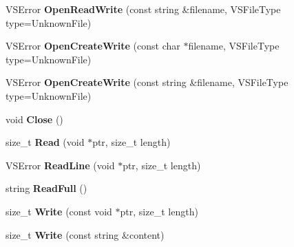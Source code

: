 \begin{DoxyCompactItemize}
\item 
V\+S\+Error {\bfseries Open\+Read\+Write} (const string \&filename, V\+S\+File\+Type type=Unknown\+File)\hypertarget{classVSFileSystem_1_1VSFile_a8e0862f673f012bb6ba94f48afb51826}{}\label{classVSFileSystem_1_1VSFile_a8e0862f673f012bb6ba94f48afb51826}

\item 
V\+S\+Error {\bfseries Open\+Create\+Write} (const char $\ast$filename, V\+S\+File\+Type type=Unknown\+File)\hypertarget{classVSFileSystem_1_1VSFile_a9a5d115a0b1c97c93ce5ae2b8adcd36b}{}\label{classVSFileSystem_1_1VSFile_a9a5d115a0b1c97c93ce5ae2b8adcd36b}

\item 
V\+S\+Error {\bfseries Open\+Create\+Write} (const string \&filename, V\+S\+File\+Type type=Unknown\+File)\hypertarget{classVSFileSystem_1_1VSFile_ae4252231c13ac3e5810cb571decf3c96}{}\label{classVSFileSystem_1_1VSFile_ae4252231c13ac3e5810cb571decf3c96}

\item 
void {\bfseries Close} ()\hypertarget{classVSFileSystem_1_1VSFile_aa96e4536ad887ff4af35704e631c41bb}{}\label{classVSFileSystem_1_1VSFile_aa96e4536ad887ff4af35704e631c41bb}

\item 
size\+\_\+t {\bfseries Read} (void $\ast$ptr, size\+\_\+t length)\hypertarget{classVSFileSystem_1_1VSFile_aff562ac3f72d0c66a71f0c0c2bc1d1e7}{}\label{classVSFileSystem_1_1VSFile_aff562ac3f72d0c66a71f0c0c2bc1d1e7}

\item 
V\+S\+Error {\bfseries Read\+Line} (void $\ast$ptr, size\+\_\+t length)\hypertarget{classVSFileSystem_1_1VSFile_a8f5c3bbb8dc24667a7d228d33105b67b}{}\label{classVSFileSystem_1_1VSFile_a8f5c3bbb8dc24667a7d228d33105b67b}

\item 
string {\bfseries Read\+Full} ()\hypertarget{classVSFileSystem_1_1VSFile_a7e4e1f490b2c1dc0c1e14b5dbd3d180b}{}\label{classVSFileSystem_1_1VSFile_a7e4e1f490b2c1dc0c1e14b5dbd3d180b}

\item 
size\+\_\+t {\bfseries Write} (const void $\ast$ptr, size\+\_\+t length)\hypertarget{classVSFileSystem_1_1VSFile_ac1b4429bcab8ca5db9b2239d309fee5e}{}\label{classVSFileSystem_1_1VSFile_ac1b4429bcab8ca5db9b2239d309fee5e}

\item 
size\+\_\+t {\bfseries Write} (const string \&content)\hypertarget{classVSFileSystem_1_1VSFile_ace3fbaf58d4daa3c8409fe09e9b5979e}{}\label{classVSFileSystem_1_1VSFile_ace3fbaf58d4daa3c8409fe09e9b5979e}


\end{DoxyCompactItemize}
